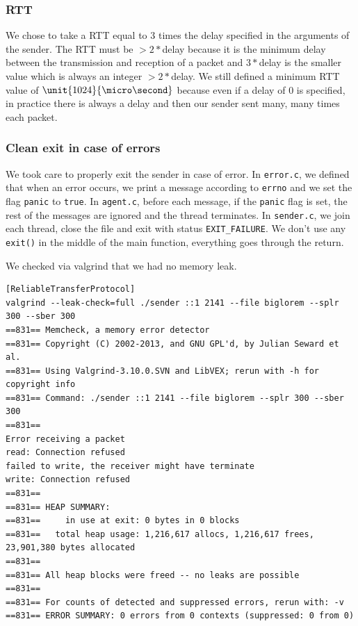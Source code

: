 \documentclass[11pt,a4paper]{article}
\begin{document}
\subsubsection{RTT}
We chose to take a RTT equal to 3 times the delay specified in the arguments of the sender. The RTT must be $> 2*$delay because it is the minimum delay between the transmission and reception of a packet and $3*$delay is the smaller value which is always an integer $>2*$delay. We still defined a minimum RTT value of $\unit{1024}{\micro\second}$ because even if a delay of $0$ is specified, in practice there is always a delay and then our sender sent many, many times each packet. 

\subsubsection{Clean exit in case of errors}
We took care to properly exit the sender in case of error. In \lstinline|error.c|, we defined that when an error occurs, we print a message according to \lstinline|errno|
and we set the flag \lstinline|panic| to \lstinline|true|. In \lstinline|agent.c|, before each message, if the \lstinline|panic| flag is set, the rest of the messages are ignored and the thread terminates. In \lstinline|sender.c|, we join each thread, close the file and exit with status \lstinline|EXIT_FAILURE|. We don't use any \texttt{exit()} in the middle of the main function, everything goes through the return.

We checked via valgrind that we had no memory leak.
\begin{lstlisting}[basicstyle=\ttfamily, basicstyle=\scriptsize]
[ReliableTransferProtocol] 
valgrind --leak-check=full ./sender ::1 2141 --file biglorem --splr 300 --sber 300
==831== Memcheck, a memory error detector
==831== Copyright (C) 2002-2013, and GNU GPL'd, by Julian Seward et al.
==831== Using Valgrind-3.10.0.SVN and LibVEX; rerun with -h for copyright info
==831== Command: ./sender ::1 2141 --file biglorem --splr 300 --sber 300
==831== 
Error receiving a packet
read: Connection refused
failed to write, the receiver might have terminate
write: Connection refused
==831== 
==831== HEAP SUMMARY:
==831==     in use at exit: 0 bytes in 0 blocks
==831==   total heap usage: 1,216,617 allocs, 1,216,617 frees, 23,901,380 bytes allocated
==831== 
==831== All heap blocks were freed -- no leaks are possible
==831== 
==831== For counts of detected and suppressed errors, rerun with: -v
==831== ERROR SUMMARY: 0 errors from 0 contexts (suppressed: 0 from 0)
\end{lstlisting}
\end{document}
